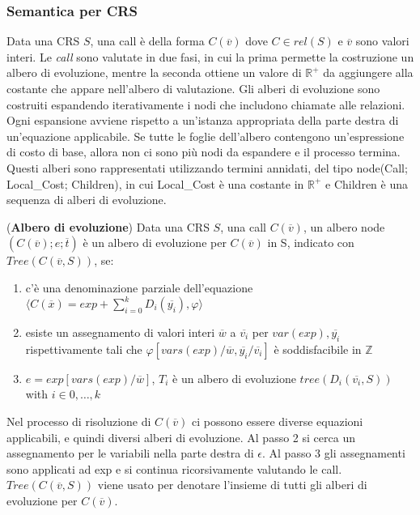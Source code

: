 \documentclass[../../main.tex]{subfiles}
\begin{document}
\subsubsection{Semantica per CRS}
Data una CRS $S$, una call è della forma $C(\overline{v})$ dove $C \in rel(S)$ e $\overline{v}$ sono valori interi.
Le \textit{call} sono valutate in due fasi, in cui la prima permette la costruzione un albero di evoluzione, mentre la seconda ottiene un valore di $\mathbb{R}^+$ da aggiungere alla costante che appare nell'albero di valutazione.
Gli alberi di evoluzione sono costruiti espandendo iterativamente i nodi che includono chiamate alle relazioni. Ogni espansione avviene rispetto a un'istanza appropriata della parte destra di un'equazione applicabile. Se tutte le foglie dell'albero contengono un'espressione di costo di base, allora non ci sono più nodi da espandere e il processo termina. Questi alberi sono rappresentati utilizzando termini annidati, del tipo node(Call; Local\_Cost; Children), in cui Local\_Cost è una costante in $\mathbb{R}^+$ e Children è una sequenza di alberi di evoluzione.

\begin{definition}(\textbf{Albero di evoluzione})
    Data una CRS $S$, una call $C(\overline{v})$, un albero node $(C(\overline{v}); e; \overline{t})$ è un albero di evoluzione per $C(\overline{v})$ in S, indicato con $Tree (C(\overline{v},S))$, se:
    \begin{enumerate}
        \item c'è una denominazione parziale dell'equazione $\langle C(\overline{x}) = exp + \sum_{i = 0}^k D_i(\overline{y_i}), \varphi \rangle$
        \item esiste un assegnamento di valori interi $\overline{w}$ a $\overline{v_i}$ per $var(exp), \overline{y_i}$ rispettivamente tali che $\varphi[vars(exp)/\overline{w}, \overline{y_i}/\overline{v_i}]$ è soddisfacibile in $\mathbb{Z}$
        \item $e = exp[vars(exp)/\overline{w}]$, $T_i$ è un albero di evoluzione  $tree(D_i (\overline{v_i}, S))$ with $i \in 0,\dots,k$ 
    \end{enumerate}
\end{definition}

Nel processo di risoluzione di $C(\overline{v})$ ci possono essere diverse equazioni applicabili, e quindi diversi alberi di evoluzione.
Al passo 2 si cerca un assegnamento per le variabili nella parte destra di $\epsilon$. Al passo 3 gli assegnamenti sono applicati ad exp e si continua ricorsivamente valutando le call.
$Tree(C(\overline{v}, S))$ viene usato per denotare l'insieme di tutti gli alberi di evoluzione per $C(\overline{v})$.
\end{document}

